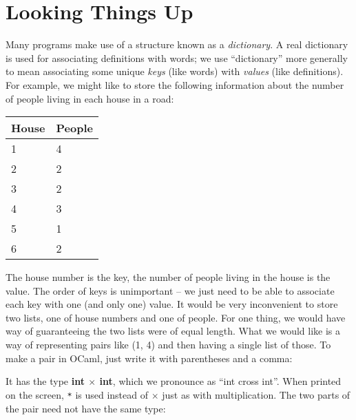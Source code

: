 \documentclass[]{book}
\newcommand{\plet}{\textbf{let}\xspace}
\newcommand{\smspace}{\vspace{4mm}}
\begin{document}
\pagestyle{empty}


\chapter{Looking Things Up}
\pagestyle{fancy}
\label{lookingthingsup}

Many programs make use of a structure known as a \textit{dictionary}. A real dictionary is used for associating definitions with words; we use ``dictionary'' more generally to mean associating some unique \textit{keys} (like words) with \textit{values} (like definitions). For example, we might like to store the following information about the number of people living in each house in a road:

\smspace
\noindent\begin{tabular}{@{}ll@{}} \toprule
House & People\\ \midrule
1 & 4\\
2 & 2\\
3 & 2\\
4 & 3\\
5 & 1\\
6 & 2\\ \bottomrule
\end{tabular}
\smspace

\noindent The house number is the key, the number of people living in the house is the value. The order of keys is unimportant -- we just need to be able to associate each key with one (and only one) value. It would be very inconvenient to store two lists, one of house numbers and one of people. For one thing, we would have way of guaranteeing the two lists were of equal length. What we would like is a way of representing pairs like (1, 4) and then having a single list of those. To make a pair in OCaml, just write it with parentheses and a comma:

\smspace
\begin{center}
\fbox{\begin{minipage}{0.8\textwidth}
\noindent\texttt{p :}\textbf{\textsf{ int $\times$ int}}\\
\\
$\texttt{\plet p = (1, 4)}$\vphantom{g}
\end{minipage}}
\end{center}
\smspace

\noindent It has the type \index{$\times$}\textbf{\textsf{int $\times$ int}}, which we pronounce as ``int cross int''. When printed on the screen, \texttt{*} is used instead of $\times$ just as with multiplication. The two parts of the pair need not have the same type:
\end{document}

